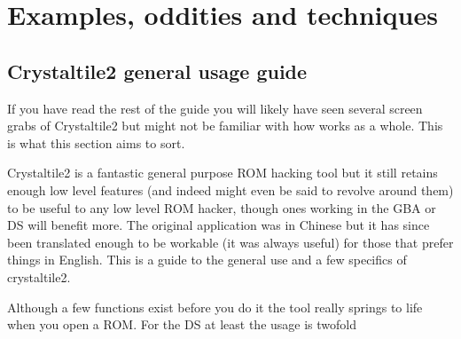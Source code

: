 \documentclass[
]{book}
\begin{document}
\hypertarget{part-examples-oddities-and-techniques}{%
\part{Examples, oddities and techniques}\label{part-examples-oddities-and-techniques}}

\hypertarget{crystaltile2-general-usage-guide}{%
\chapter{Crystaltile2 general usage guide}\label{crystaltile2-general-usage-guide}}

If you have read the rest of the guide you will likely have seen several screen grabs of Crystaltile2 but might not be familiar with how works as a whole. This is what this section aims to sort.

Crystaltile2 is a fantastic general purpose ROM hacking tool but it still retains enough low level features (and indeed might even be said to revolve around them) to be useful to any low level ROM hacker, though ones working in the GBA or DS will benefit more. The original application was in Chinese but it has since been translated enough to be workable (it was always useful) for those that prefer things in English. This is a guide to the general use and a few specifics of crystaltile2.

Although a few functions exist before you do it the tool really springs to life when you open a ROM. For the DS at least the usage is twofold
\end{document}
